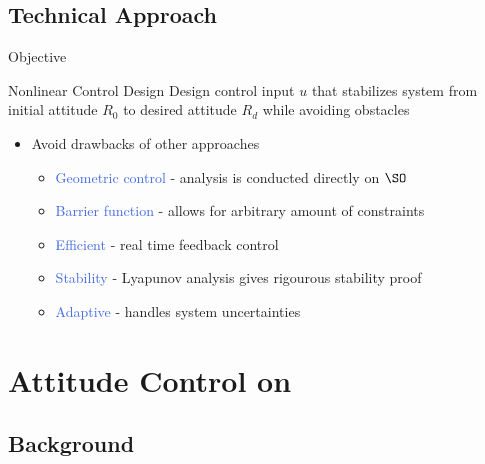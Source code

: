 \documentclass[11pt,professionalfonts]{beamer}
\newcommand{\vs}{\vspace{0.3cm}}
\def\Emph{\textcolor{RoyalBlue}}
\begin{document}
\subsection*{Technical Approach}

\begin{frame}{Objective} %

	\begin{block}{Nonlinear Control Design}
		Design control input \( u \) that stabilizes system from initial attitude \( R_0 \) to desired attitude \( R_d \) while avoiding obstacles
	\end{block}
	\pause
	\vs
	\begin{itemize}
		\item Avoid drawbacks of other approaches 
		\begin{itemize}
			\item \Emph{Geometric control} - analysis is conducted directly on \( \SO \) 
			\item \Emph{Barrier function} - allows for arbitrary amount of constraints
			\item \Emph{Efficient } - real time feedback control
			\item \Emph{Stability} - Lyapunov analysis gives rigourous stability proof
			\item \Emph{Adaptive} - handles system uncertainties
		\end{itemize}
	\end{itemize}
\end{frame}

\section*{Attitude Control on \SO}
\subsection*{Background}
\end{document}
